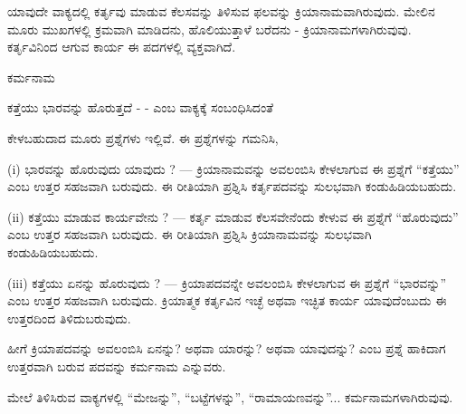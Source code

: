 \kbvcontinued ಯಾವುದೇ ವಾಕ್ಯದಲ್ಲಿ ಕರ್ತೃವು ಮಾಡುವ ಕೆಲಸವನ್ನು ತಿಳಿಸುವ ಫಲವನ್ನು ಕ್ರಿಯಾನಾಮವಾಗಿರುವುದು. ಮೇಲಿನ ಮೂರು ಮುಖಗಳಲ್ಲಿ ಕ್ರಮವಾಗಿ ಮಾಡಿದನು, ಹೊಲಿಯುತ್ತಾಳೆ ಬರೆದನು - ಕ್ರಿಯಾನಾಮಗಳಾಗಿರುವುವು. ಕರ್ತೃವಿನಿಂದ ಆಗುವ ಕಾರ್ಯ ಈ ಪದಗಳಲ್ಲಿ ವ್ಯಕ್ತವಾಗಿದೆ.\par

\vspace{2.5pt plus 3pt minus 0.5pt}\noindent\hspace*{1.2em}\hspace{0.55em}ಕರ್ಮನಾಮ\par

\indent ಕತ್ತೆಯು ಭಾರವನ್ನು ಹೊರುತ್ತದೆ - - ಎಂಬ ವಾಕ್ಯಕ್ಕೆ ಸಂಬಂಧಿಸಿದಂತೆ\par

\indent ಕೇಳಬಹುದಾದ ಮೂರು ಪ್ರಶ್ನೆಗಳು ಇಲ್ಲಿವೆ. ಈ ಪ್ರಶ್ನೆಗಳನ್ನು ಗಮನಿಸಿ,\par

\indent ({\kbvlatin i}) ಭಾರವನ್ನು ಹೊರುವುದು ಯಾವುದು ? --- ಕ್ರಿಯಾನಾಮವನ್ನು ಅವಲಂಬಿಸಿ ಕೇಳಲಾಗುವ ಈ ಪ್ರಶ್ನೆಗೆ “ಕತ್ತೆಯು” ಎಂಬ ಉತ್ತರ ಸಹಜವಾಗಿ ಬರುವುದು. ಈ ರೀತಿಯಾಗಿ ಪ್ರಶ್ನಿಸಿ ಕರ್ತೃಪದವನ್ನು ಸುಲಭವಾಗಿ ಕಂಡುಹಿಡಿಯಬಹುದು.\par

\indent ({\kbvlatin ii}) ಕತ್ತೆಯು ಮಾಡುವ ಕಾರ್ಯವೇನು ? --- ಕರ್ತೃ ಮಾಡುವ ಕೆಲಸವೇನೆಂದು ಕೇಳುವ ಈ ಪ್ರಶ್ನೆಗೆ “ಹೊರುವುದು” ಎಂಬ ಉತ್ತರ ಸಹಜವಾಗಿ ಬರುವುದು. ಈ ರೀತಿಯಾಗಿ ಪ್ರಶ್ನಿಸಿ ಕ್ರಿಯಾನಾಮವನ್ನು ಸುಲಭವಾಗಿ ಕಂಡುಹಿಡಿಯಬಹುದು.\par

\indent ({\kbvlatin iii}) ಕತ್ತೆಯು ಏನನ್ನು ಹೊರುವುದು ? --- ಕ್ರಿಯಾಪದವನ್ನೇ ಅವಲಂಬಿಸಿ ಕೇಳಲಾಗುವ ಈ ಪ್ರಶ್ನೆಗೆ “ಭಾರವನ್ನು” ಎಂಬ ಉತ್ತರ ಸಹಜವಾಗಿ ಬರುವುದು. ಕ್ರಿಯಾತ್ಮಕ ಕರ್ತೃವಿನ ಇಚ್ಛೆ ಅಥವಾ ಇಚ್ಛಿತ ಕಾರ್ಯ ಯಾವುದೆಂಬುದು ಈ ಉತ್ತರದಿಂದ ತಿಳಿದುಬರುವುದು.\par

\indent ಹೀಗೆ ಕ್ರಿಯಾಪದವನ್ನು ಅವಲಂಬಿಸಿ ಏನನ್ನು? ಅಥವಾ ಯಾರನ್ನು? ಅಥವಾ ಯಾವುದನ್ನು? ಎಂಬ ಪ್ರಶ್ನೆ ಹಾಕಿದಾಗ ಉತ್ತರವಾಗಿ ಬರುವ ಪದವನ್ನು ಕರ್ಮನಾಮ ಎನ್ನುವರು.\par

\indent ಮೇಲೆ ತಿಳಿಸಿರುವ ವಾಕ್ಯಗಳಲ್ಲಿ “ಮೇಜನ್ನು”, “ಬಟ್ಟೆಗಳನ್ನು”, “ರಾಮಾಯಣವನ್ನು”... ಕರ್ಮನಾಮಗಳಾಗಿರುವುವು.\par
